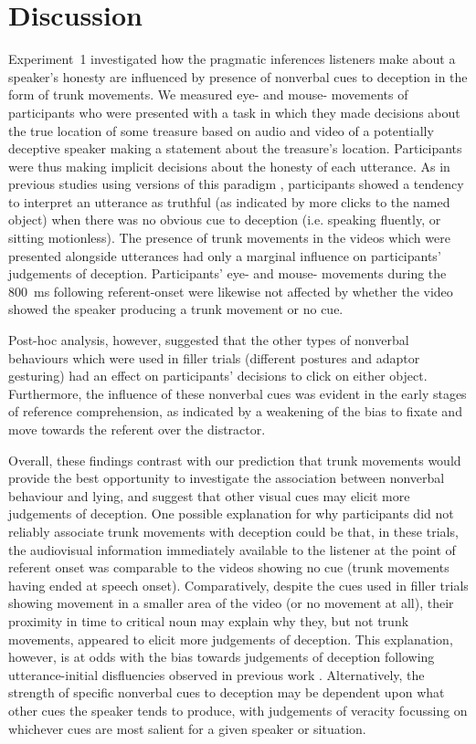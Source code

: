 \documentclass[a4paper,man,natbib]{apa6}
\begin{document}
\section{Discussion}
Experiment~1 investigated how the pragmatic inferences listeners make about a speaker's honesty are influenced by presence of nonverbal cues to deception in the form of trunk movements.
We measured eye- and mouse- movements of participants who were presented with a task in which they made decisions about the true location of some treasure based on audio and video of a potentially deceptive speaker making a statement about the treasure's location.
Participants were thus making implicit decisions about the honesty of each utterance.
As in previous studies using versions of this paradigm \citep{Loy2017, King2018}, participants showed a tendency to interpret an utterance as truthful (as indicated by more clicks to the named object) when there was no obvious cue to deception (i.e. speaking fluently, or sitting motionless).
The presence of trunk movements in the videos which were presented alongside utterances had only a marginal influence on participants' judgements of deception.
Participants' eye- and mouse- movements during the 800~ms following referent-onset were likewise not affected by whether the video showed the speaker producing a trunk movement or no cue.

Post-hoc analysis, however, suggested that the other types of nonverbal behaviours which were used in filler trials (different postures and adaptor gesturing) had an effect on participants' decisions to click on either object. 
Furthermore, the influence of these nonverbal cues was evident in the early stages of reference comprehension, as indicated by a weakening of the bias to fixate and move towards the referent over the distractor. 

Overall, these findings contrast with our prediction that trunk movements would provide the best opportunity to investigate the association between nonverbal behaviour and lying, and suggest that other visual cues may elicit more judgements of deception. 
One possible explanation for why participants did not reliably associate trunk movements with deception could be that, in these trials, the audiovisual information immediately available to the listener at the point of referent onset was comparable to the videos showing no cue (trunk movements having ended at speech onset).
Comparatively, despite the cues used in filler trials showing movement in a smaller area of the video (or no movement at all), their proximity in time to critical noun may explain why they, but not trunk movements, appeared to elicit more judgements of deception.
This explanation, however, is at odds with the bias towards judgements of deception following utterance-initial disfluencies observed in previous work \citep[][Experiment~1]{Loy2017}.
Alternatively, the strength of specific nonverbal cues to deception may be dependent upon what other cues the speaker tends to produce, with judgements of veracity focussing on whichever cues are most salient for a given speaker or situation. %
\end{document}
